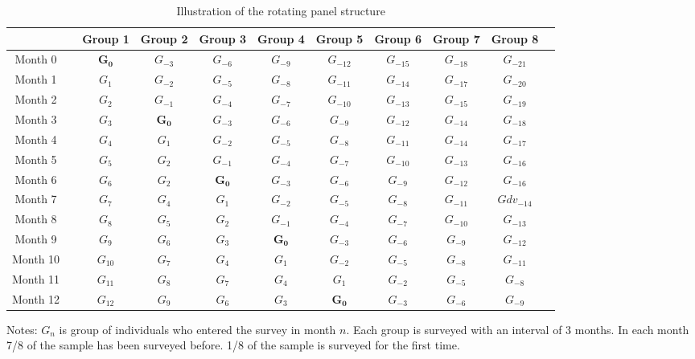 \begin{table}[h]
	\caption{Illustration of the rotating panel structure}
	\label{tab:rot_panel}
	\begin{tabularx}{\linewidth}{cXccccccccc}
	\toprule[1pt] 
	 && Group 1 & Group 2 & Group 3 & Group 4 & Group 5 & Group 6  & Group 7 & Group 8 \\ \hline 
Month 0 && $\mathbf{G_{0}}$ & $G_{-3}$ & $G_{-6}$ & $G_{-9}$ & $G_{-12}$ & $G_{-15}$ & $G_{-18}$ & $G_{-21}$ \\
Month 1 && $G_{1}$ & $G_{-2}$ & $G_{-5}$ & $G_{-8}$ & $G_{-11}$ & $G_{-14}$ & $G_{-17}$ & $G_{-20}$ \\
Month 2 && $G_{2}$ & $G_{-1}$ & $G_{-4}$ & $G_{-7}$ & $G_{-10}$ & $G_{-13}$ & $G_{-15}$ & $G_{-19}$ \\ 
Month 3 && $G_{3}$ & $\mathbf{G_{0}}$ & $G_{-3}$ & $G_{-6}$ & $G_{-9}$ & $G_{-12}$ & $G_{-14}$ & $G_{-18}$ \\
Month 4 && $G_{4}$ & $G_{1}$ & $G_{-2}$ & $G_{-5}$ & $G_{-8}$ & $G_{-11}$ & $G_{-14}$ & $G_{-17}$ \\  
Month 5 && $G_{5}$ & $G_{2}$ & $G_{-1}$ & $G_{-4}$ & $G_{-7}$ & $G_{-10}$ & $G_{-13}$ & $G_{-16}$ \\ 
Month 6 && $G_{6}$ & $G_{2}$ & $\mathbf{G_{0}}$ & $G_{-3}$ & $G_{-6}$ & $G_{-9}$ & $G_{-12}$ & $G_{-16}$ \\ 
Month 7 && $G_{7}$ & $G_{4}$ & $G_{1}$ & $G_{-2}$ & $G_{-5}$ & $G_{-8}$ & $G_{-11}$ & $Gdv_{-14}$ \\ 
Month 8 && $G_{8}$ & $G_{5}$ & $G_{2}$ & $G_{-1}$ & $G_{-4}$ & $G_{-7}$ & $G_{-10}$ & $G_{-13}$ \\ 
Month 9 && $G_{9}$ & $G_{6}$ & $G_{3}$ & $\mathbf{G_{0}}$ & $G_{-3}$ & $G_{-6}$ & $G_{-9}$ & $G_{-12}$ \\ 
Month 10 && $G_{10}$ & $G_{7}$ & $G_{4}$ & $G_{1}$ & $G_{-2}$ & $G_{-5}$ & $G_{-8}$ & $G_{-11}$ \\ 
Month 11 && $G_{11}$ & $G_{8}$ & $G_{7}$ & $G_{4}$ & $G_{1}$ & $G_{-2}$ & $G_{-5}$ & $G_{-8}$ \\
Month 12 && $G_{12}$ & $G_{9}$ & $G_{6}$ & $G_{3}$ & $\mathbf{G_{0}}$ & $G_{-3}$ & $G_{-6}$ & $G_{-9}$ \\  
	\bottomrule[1pt]
	\end{tabularx}
	\begin{minipage}{\linewidth}
		\footnotesize{Notes: $G_n$ is group of individuals who entered the survey in month $n$. Each group is surveyed with an interval of 3 months. In each month 7/8 of the sample has been surveyed before. 1/8 of the sample is surveyed for the first time.}
	\end{minipage}
\end{table}	

